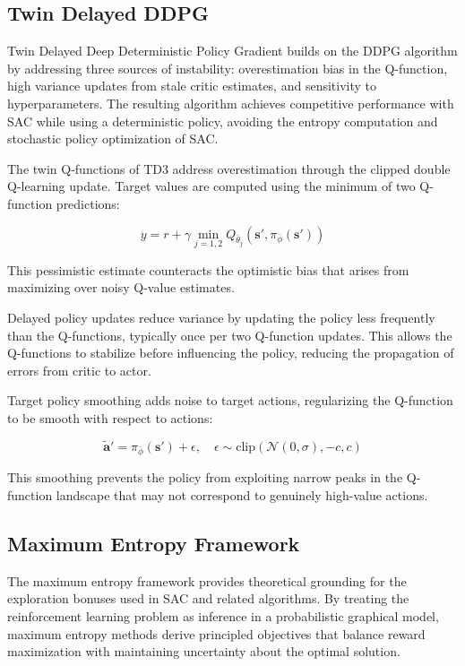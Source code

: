 \subsection{Twin Delayed DDPG}
\label{subsec:td3}

Twin Delayed Deep Deterministic Policy Gradient builds on the DDPG algorithm by addressing three sources of instability: overestimation bias in the Q-function, high variance updates from stale critic estimates, and sensitivity to hyperparameters. The resulting algorithm achieves competitive performance with SAC while using a deterministic policy, avoiding the entropy computation and stochastic policy optimization of SAC.

The twin Q-functions of TD3 address overestimation through the clipped double Q-learning update. Target values are computed using the minimum of two Q-function predictions:

\begin{equation}
y = r + \gamma \min_{j=1,2} Q_{\bar{\theta}_j}(\mathbf{s}', \pi_{\bar{\phi}}(\mathbf{s}'))
\end{equation}

This pessimistic estimate counteracts the optimistic bias that arises from maximizing over noisy Q-value estimates.

Delayed policy updates reduce variance by updating the policy less frequently than the Q-functions, typically once per two Q-function updates. This allows the Q-functions to stabilize before influencing the policy, reducing the propagation of errors from critic to actor.

Target policy smoothing adds noise to target actions, regularizing the Q-function to be smooth with respect to actions:

\begin{equation}
\tilde{\mathbf{a}}' = \pi_{\bar{\phi}}(\mathbf{s}') + \epsilon, \quad \epsilon \sim \text{clip}(\mathcal{N}(0, \sigma), -c, c)
\end{equation}

This smoothing prevents the policy from exploiting narrow peaks in the Q-function landscape that may not correspond to genuinely high-value actions.

\subsection{Maximum Entropy Framework}
\label{subsec:max_entropy}

The maximum entropy framework provides theoretical grounding for the exploration bonuses used in SAC and related algorithms. By treating the reinforcement learning problem as inference in a probabilistic graphical model, maximum entropy methods derive principled objectives that balance reward maximization with maintaining uncertainty about the optimal solution.

